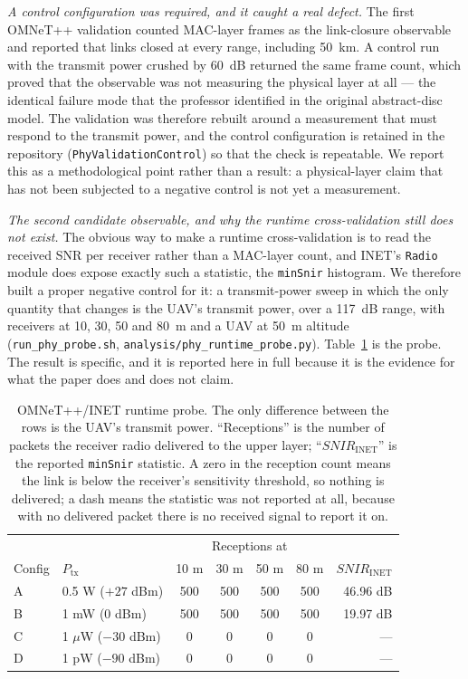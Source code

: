 \documentclass[conference]{IEEEtran}
\begin{document}
\emph{A control configuration was required, and it caught a real defect.} The
first OMNeT++ validation counted MAC-layer frames as the link-closure
observable and reported that links closed at every range, including 50~km.
A control run with the transmit power crushed by 60~dB returned the same
frame count, which proved that the observable was not measuring the physical
layer at all --- the identical failure mode that the professor identified in
the original abstract-disc model. The validation was therefore rebuilt around
a measurement that must respond to the transmit power, and the control
configuration is retained in the repository
(\texttt{PhyValidationControl}) so that the check is repeatable. We report
this as a methodological point rather than a result: a physical-layer claim
that has not been subjected to a negative control is not yet a measurement.

\emph{The second candidate observable, and why the runtime cross-validation
still does not exist.} The obvious way to make a runtime cross-validation is
to read the received SNR per receiver rather than a MAC-layer count, and
INET's \texttt{Radio} module does expose exactly such a statistic, the
\texttt{minSnir} histogram. We therefore built a proper negative control for
it: a transmit-power sweep in which the only quantity that changes is the
UAV's transmit power, over a 117~dB range, with receivers at 10, 30, 50 and
80~m and a UAV at 50~m altitude (\texttt{run\_phy\_probe.sh},
\texttt{analysis/phy\_runtime\_probe.py}). Table~\ref{tab:phyprobe} is the
probe.  The result is specific, and it is
reported here in full because it is the evidence for what the paper does and
does not claim.

\begin{table}[t]
\caption{OMNeT++/INET runtime probe. The only difference between the rows is
the UAV's transmit power. ``Receptions'' is the number of packets the receiver
radio delivered to the upper layer; ``$SNIR_{\mathrm{INET}}$'' is the
reported \texttt{minSnir} statistic.  A zero in the reception count means
the link is below the receiver's sensitivity threshold, so nothing is
delivered; a dash means the statistic was not reported at all, because with
no delivered packet there is no received signal to report it on.}
\label{tab:phyprobe}
\centering
\scriptsize
\begin{tabular}{@{}llccccr@{}}
\toprule
& & \multicolumn{4}{c}{Receptions at} & \\
Config & $P_{\mathrm{tx}}$ & 10 m & 30 m & 50 m & 80 m & $SNIR_{\mathrm{INET}}$ \\
\midrule
A & 0.5 W ($+27$ dBm)   & 500 & 500 & 500 & 500 & 46.96 dB \\
B & 1 mW ($0$ dBm)  & 500 & 500 & 500 & 500 & 19.97 dB \\
C & 1 $\mu$W ($-30$ dBm) & 0 & 0 & 0 & 0 & --- \\
D & 1 pW ($-90$ dBm) & 0 & 0 & 0 & 0 & --- \\
\bottomrule
\end{tabular}
\end{table}
\end{document}
